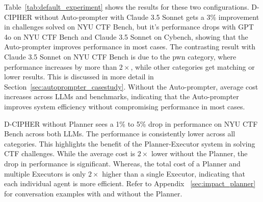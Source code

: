 Table~\ref{tab:default_experiment} shows the results for these two configurations.
D-CIPHER without Auto-prompter with Claude 3.5 Sonnet gets a 3\% improvement in challenges solved on NYU CTF Bench, but it's performance drops with GPT 4o on NYU CTF Bench and Claude 3.5 Sonnet on Cybench, showing that the Auto-prompter improves performance in most cases.
The contrasting result with Claude 3.5 Sonnet on NYU CTF Bench is due to the pwn category, where performance increases by more than $2\times$, while other categories get matching or lower results.
This is discussed in more detail in Section~\ref{sec:autoprompter_casestudy}. %
Without the Auto-prompter, average cost increases across LLMs and benchmarks, indicating that the Auto-prompter improves system efficiency without compromising performance in most cases.

D-CIPHER without Planner sees a 1\% to 5\% drop in performance on NYU CTF Bench across both LLMs. The performance is consistently lower across all categories.
This highlights the benefit of the Planner-Executor system in solving CTF challenges.
While the average cost is $2\times$ lower without the Planner, the drop in performance is significant.
Whereas, the total cost of a Planner and multiple Executors is only $2\times$ higher than a single Executor, indicating that each individual agent is more efficient. Refer to Appendix~ \ref{sec:impact_planner} for conversation examples with and without the Planner.



